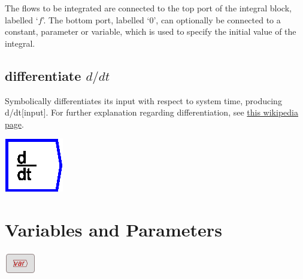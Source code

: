 The flows to be integrated are connected to the top port of the integral
block, labelled `$f$'. The bottom port, labelled `0', can optionally
be connected to a constant, parameter or variable, which is used to
specify the initial value of the integral.

\subsection{differentiate $d/dt$}

\label{Operation:differentiate} Symbolically differentiates its input
with respect to system time, producing d/dt{[}input{]}. For further
explanation regarding differentiation, see \href{https://en.wikipedia.org/wiki/Derivative}{this wikipedia page}.

\includegraphics{images/differential}

\section{Variables and Parameters}

\label{Variables}\label{Variable:constant}\label{VarConstant}\label{Variable:parameter}
\label{Variable:flow}\label{Variable:integral}\label{Variable:stock}

\includegraphics{images/var}

